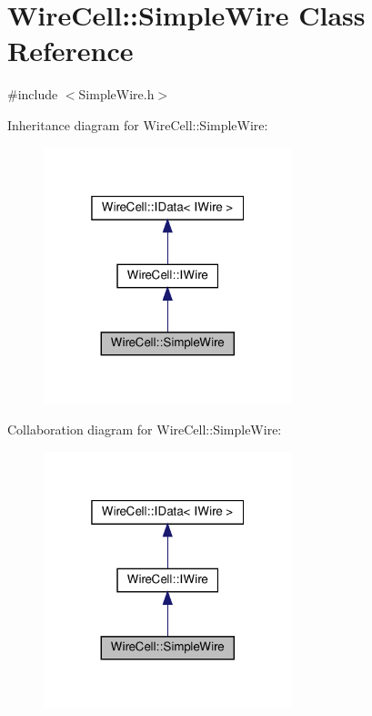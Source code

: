 \hypertarget{class_wire_cell_1_1_simple_wire}{}\section{Wire\+Cell\+:\+:Simple\+Wire Class Reference}
\label{class_wire_cell_1_1_simple_wire}


{\ttfamily \#include $<$Simple\+Wire.\+h$>$}



Inheritance diagram for Wire\+Cell\+:\+:Simple\+Wire\+:
\nopagebreak
\begin{figure}[H]
\begin{center}
\leavevmode
\includegraphics[width=205pt]{class_wire_cell_1_1_simple_wire__inherit__graph}
\end{center}
\end{figure}


Collaboration diagram for Wire\+Cell\+:\+:Simple\+Wire\+:
\nopagebreak
\begin{figure}[H]
\begin{center}
\leavevmode
\includegraphics[width=205pt]{class_wire_cell_1_1_simple_wire__coll__graph}
\end{center}
\end{figure}
